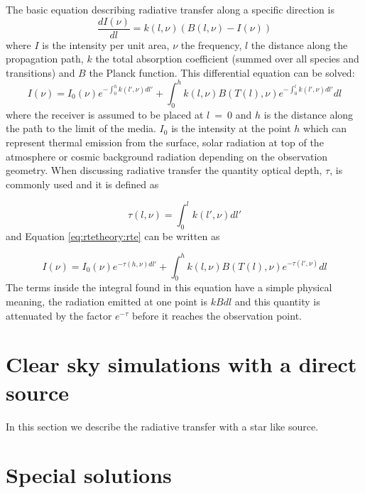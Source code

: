 The basic equation describing radiative transfer along a specific 
 direction is
 \begin{equation}
   \frac{dI(\nu)}{dl} = k(l,\nu)(B(l,\nu)-I(\nu))
  \label{eq:rtetheory:chand}
 \end{equation} 
 where $I$ is the intensity per unit area, $\nu$ the frequency, $l$
 the distance along the propagation path, $k$ the total absorption
 coefficient (summed over all species and transitions) and $B$ the
 Planck function. This differential equation can be solved:
 \begin{equation}
   I(\nu) = I_0(\nu)e^{-\int^h_0{k(l',\nu)dl'}} + 
     \int^h_0{k(l,\nu)B(T(l),\nu) e^{-\int^l_0{k(l',\nu)dl'}} dl}
  \label{eq:rtetheory:rte}
 \end{equation}  
 where the receiver is assumed to be placed at $l$~=~0 and $h$ is the
 distance along the path to the limit of the media. $I_0$ is the
 intensity at the point $h$ which can represent thermal emission from
 the surface, solar radiation at top of the atmosphere or cosmic
 background radiation depending on the observation geometry. When
 discussing radiative transfer the quantity optical depth, $\tau$, is
 commonly used and it is defined as

 \begin{equation}
   \tau(l,\nu) = \int^l_0{k(l',\nu)dl'} 
  \label{eq:rtetheory:tau}
 \end{equation}  
 and Equation \ref{eq:rtetheory:rte} can be written as
 
 \begin{equation}
   I(\nu) = I_0(\nu)e^{-\tau(h,\nu)dl'} + 
     \int^h_0{k(l,\nu)B(T(l),\nu) e^{-\tau(l',\nu)} dl}
  \label{eq:rtetheory:rte2}
 \end{equation}  
 The terms inside the integral found in this equation have a simple
 physical meaning, the radiation emitted at one point is $kBdl$ and this
 quantity is attenuated by the factor $e^{-\tau}$ before it reaches the
 observation point.

 \section{Clear sky simulations with a direct source}
 \label{sec:rtetheory:ClearskyDirectSources}

 In this section we describe the radiative transfer with a star like source.

 


\section{Special solutions}
 \label{sec:rtetheory:special}
 
